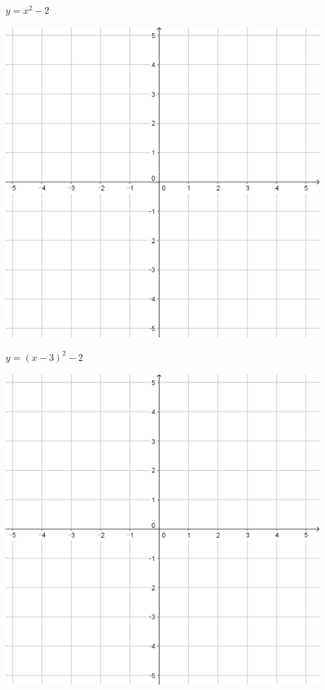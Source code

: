 \documentclass[a4paper]{oblivoir}
\begin{document}
\begin{minipage}{0.45\textwidth}\centering
\(y=x^2-2\)
\par\bigskip\includegraphics[width=0.9\textwidth]{55}
\end{minipage}
\begin{minipage}{0.45\textwidth}\centering
\(y=(x-3)^2-2\)
\par\bigskip\includegraphics[width=0.9\textwidth]{55}
\end{minipage}\bigskip\bigskip\par
\end{document}
